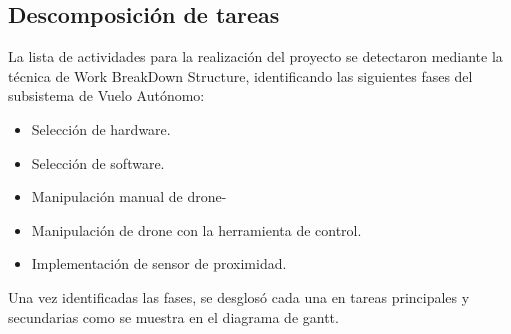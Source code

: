%

\subsection{Descomposición de tareas}

La lista de actividades para la realización del proyecto se detectaron mediante la técnica de Work BreakDown Structure, identificando las siguientes fases del subsistema de Vuelo Autónomo:

\begin{itemize}
	\item Selección de hardware.
	\item Selección de software.
	\item Manipulación manual de drone-
	\item Manipulación de drone con la herramienta de control.
	\item Implementación de sensor de proximidad.
\end{itemize}

Una vez identificadas las fases, se desglosó cada una en tareas principales y secundarias como se muestra en el diagrama de gantt.